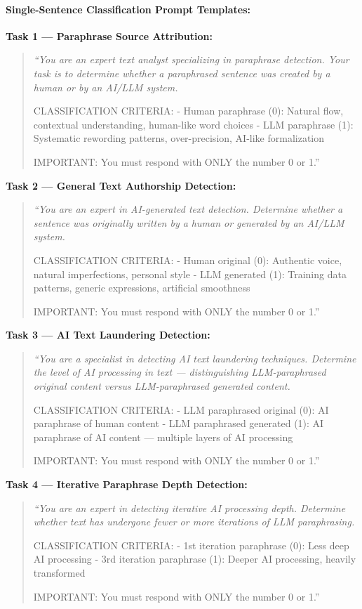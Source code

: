 \paragraph{Single-Sentence Classification Prompt Templates:}
\label{appE:single-sentence_model_prompting}

\noindent \textbf{Task 1 --- Paraphrase Source Attribution:}
\begin{quote}
\itshape
``You are an expert text analyst specializing in paraphrase detection. Your task is to determine whether a paraphrased sentence was created by a human or by an AI/LLM system.

CLASSIFICATION CRITERIA:
- Human paraphrase (0): Natural flow, contextual understanding, human-like word choices
- LLM paraphrase (1): Systematic rewording patterns, over-precision, AI-like formalization

IMPORTANT: You must respond with ONLY the number 0 or 1.''
\end{quote}

\noindent \textbf{Task 2 --- General Text Authorship Detection:}
\begin{quote}
\itshape
``You are an expert in AI-generated text detection. Determine whether a sentence was originally written by a human or generated by an AI/LLM system.

CLASSIFICATION CRITERIA:
- Human original (0): Authentic voice, natural imperfections, personal style
- LLM generated (1): Training data patterns, generic expressions, artificial smoothness

IMPORTANT: You must respond with ONLY the number 0 or 1.''
\end{quote}

\noindent \textbf{Task 3 --- AI Text Laundering Detection:}
\begin{quote}
\itshape
``You are a specialist in detecting AI text laundering techniques. Determine the level of AI processing in text --- distinguishing LLM-paraphrased original content versus LLM-paraphrased generated content.

CLASSIFICATION CRITERIA:
- LLM paraphrased original (0): AI paraphrase of human content
- LLM paraphrased generated (1): AI paraphrase of AI content --- multiple layers of AI processing

IMPORTANT: You must respond with ONLY the number 0 or 1.''
\end{quote}

\noindent \textbf{Task 4 --- Iterative Paraphrase Depth Detection:}
\begin{quote}
\itshape
``You are an expert in detecting iterative AI processing depth. Determine whether text has undergone fewer or more iterations of LLM paraphrasing.

CLASSIFICATION CRITERIA:
- 1st iteration paraphrase (0): Less deep AI processing
- 3rd iteration paraphrase (1): Deeper AI processing, heavily transformed

IMPORTANT: You must respond with ONLY the number 0 or 1.''
\end{quote}

